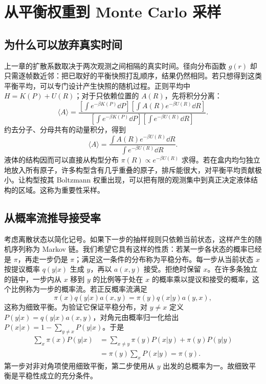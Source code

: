 \chapter{从平衡权重到 Monte Carlo 采样}
\section{为什么可以放弃真实时间}
上一章的扩散系数取决于两次观测之间相隔的真实时间。径向分布函数 $g(r)$ 却只需逐帧数近邻：把已取好的平衡快照打乱顺序，结果仍然相同。若只想得到这类平衡平均，可以专门设计产生快照的随机过程。正则平均中 $H=K(P)+U(R)$；对于只依赖位置的 $A(R)$，先将积分分离：
\begin{equation}
\langle A\rangle=
\frac{[\int e^{-\beta K(P)}\dd P][\int A(R)e^{-\beta U(R)}\dd R]}
{[\int e^{-\beta K(P)}\dd P][\int e^{-\beta U(R)}\dd R]}.
\end{equation}
约去分子、分母共有的动量积分，得到
\begin{equation}
\langle A\rangle=\frac{\int A(R)e^{-\beta U(R)}\dd R}{\int e^{-\beta U(R)}\dd R}.
\end{equation}
液体的结构因而可以直接从构型分布 $\pi(R)\propto e^{-\beta U(R)}$ 求得。若在盒内均匀独立地放入所有原子，许多构型含有几乎重叠的原子，排斥能很大，对平衡平均贡献极小。让构型按其 Boltzmann 权重出现，可以把有限的观测集中到真正决定液体结构的区域。这称为重要性采样。

\section{从概率流推导接受率}
考虑离散状态以简化记号。如果下一步的抽样规则只依赖当前状态，这样产生的随机序列称为 Markov 链。我们希望它具有这样的性质：若某一步各状态的概率已经是 $\pi$，再走一步仍是 $\pi$；满足这一条件的分布称为平稳分布。每一步从当前状态 $x$ 按提议概率 $q(y|x)$ 生成 $y$，再以 $a(x,y)$ 接受。拒绝时保留 $x$。在许多条独立的链中，一步内从 $x$ 移到 $y$ 的比例等于处在 $x$ 的概率乘以提议和接受的概率，这个比例称为一步的概率流。若正反概率流满足
\begin{equation}
\pi(x)q(y|x)a(x,y)=\pi(y)q(x|y)a(y,x),
\end{equation}
这称为细致平衡。为验证它保证平稳分布，对 $y\ne x$ 定义 $P(y|x)=q(y|x)a(x,y)$，对角元由概率归一化给出 $P(x|x)=1-\sum_{y\ne x}P(y|x)$。于是
\begin{align}
\sum_x\pi(x)P(y|x)
&=\sum_{x\ne y}\pi(y)P(x|y)+\pi(y)P(y|y)\\
&=\pi(y)\sum_xP(x|y)=\pi(y).
\end{align}
第一步对非对角项使用细致平衡，第二步使用从 $y$ 出发的总概率为一。故细致平衡是平稳性成立的充分条件。

